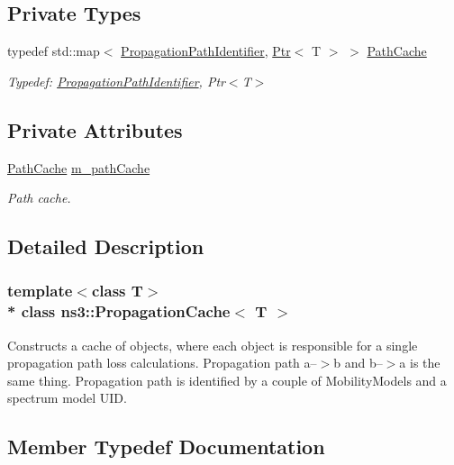 \subsection*{Private Types}
\begin{DoxyCompactItemize}
\item 
typedef std\+::map$<$ \hyperlink{structns3_1_1PropagationCache_1_1PropagationPathIdentifier}{Propagation\+Path\+Identifier}, \hyperlink{classns3_1_1Ptr}{Ptr}$<$ T $>$ $>$ \hyperlink{classns3_1_1PropagationCache_a6cb0dc5a942f439290db0c4aa90bc6e7}{Path\+Cache}
\begin{DoxyCompactList}\small\item\em Typedef\+: \hyperlink{structns3_1_1PropagationCache_1_1PropagationPathIdentifier}{Propagation\+Path\+Identifier}, Ptr$<$\+T$>$ \end{DoxyCompactList}\end{DoxyCompactItemize}
\subsection*{Private Attributes}
\begin{DoxyCompactItemize}
\item 
\hyperlink{classns3_1_1PropagationCache_a6cb0dc5a942f439290db0c4aa90bc6e7}{Path\+Cache} \hyperlink{classns3_1_1PropagationCache_a4ca67187982022709a0c12bfefb3d8a4}{m\+\_\+path\+Cache}
\begin{DoxyCompactList}\small\item\em Path cache. \end{DoxyCompactList}\end{DoxyCompactItemize}


\subsection{Detailed Description}
\subsubsection*{template$<$class T$>$\\*
class ns3\+::\+Propagation\+Cache$<$ T $>$}

Constructs a cache of objects, where each object is responsible for a single propagation path loss calculations. Propagation path a--$>$b and b--$>$a is the same thing. Propagation path is identified by a couple of Mobility\+Models and a spectrum model U\+ID. 

\subsection{Member Typedef Documentation}
